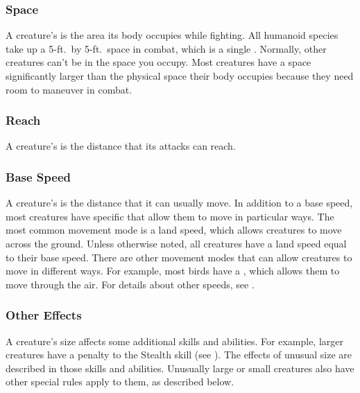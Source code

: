         \subsubsection{Space}\label{Space}
            A creature's  is the area its body occupies while fighting.
            All humanoid species take up a 5-ft.\ by 5-ft.\ space in combat, which is a single .
            Normally, other creatures can't be in the space you occupy.
            Most creatures have a space significantly larger than the physical space their body occupies because they need room to maneuver in combat.

        \subsubsection{Reach}\label{Reach}
            A creature's  is the distance that its  attacks can reach.

        \subsubsection{Base Speed}\label{Base Speed}
            A creature's  is the distance that it can usually move.
            In addition to a base speed, most creatures have specific  that allow them to move in particular ways.
            The most common movement mode is a land speed, which allows creatures to move across the ground.
            Unless otherwise noted, all creatures have a land speed equal to their base speed.
            There are other movement modes that can allow creatures to move in different ways.
            For example, most birds have a , which allows them to move through the air.
            For details about other speeds, see .

        \subsubsection{Other Effects}
            A creature's size affects some additional skills and abilities.
            For example, larger creatures have a penalty to the Stealth skill (see ).
            The effects of unusual size are described in those skills and abilities.
            Unusually large or small creatures also have other special rules apply to them, as described below.

